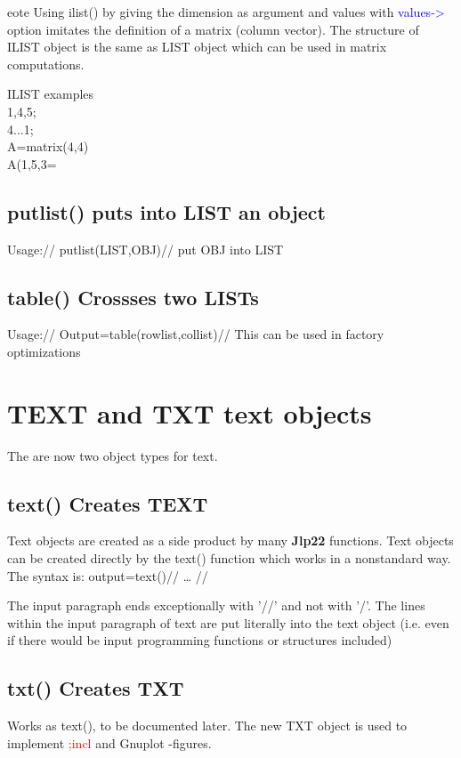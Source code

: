 \begin{note}
eote
Using \textcolor{VioletRed}{ilist}() by giving the dimension as argument and values with \textcolor{blue}{values->} option
imitates the definition of a matrix (column vector). The structure of ILIST object
is the same as LIST object which can be used in matrix computations.
\end{note}
\begin{example}[ilistex]ILIST examples\\
\label{ilistex}
{1,4,5};\\
{4...1};\\
A=\textcolor{VioletRed}{matrix}(4,4)\\
A({1,5},{3}=
\end{example}
\subsection{\textcolor{VioletRed}{putlist}() puts into LIST an object}
\label{putlist}
Usage://
\textcolor{VioletRed}{putlist}(LIST,OBJ)//
put OBJ into LIST
\subsection{\textcolor{VioletRed}{table}() Crossses two LISTs}
\label{table}
Usage://
Output=\textcolor{VioletRed}{table}(rowlist,collist)//
This can be used in factory optimizations
\section{TEXT and TXT text objects}
\label{texts}
The are now two object types for text.
\subsection{\textcolor{VioletRed}{text}() Creates TEXT}
\label{text}
Text objects are created as a side product by many \textbf{Jlp22} functions. Text objects can be created
directly by the \textcolor{VioletRed}{text}() function which works in a nonstandard way. The syntax is:
output=\textcolor{VioletRed}{text}()//
…
//

The input paragraph ends exceptionally with '//' and not with '/'. The lines within the input
paragraph of text are put literally into the text object (i.e. even if there would be input
programming functions or structures included)
\subsection{\textcolor{VioletRed}{txt}() Creates TXT}
\label{txt}
Works as \textcolor{VioletRed}{text}(), to be documented later. The new TXT object is used
to implement \textcolor{Red}{;incl} and Gnuplot -figures.
